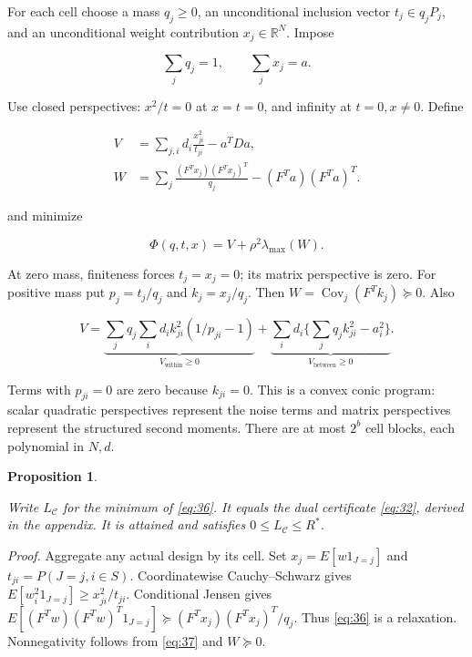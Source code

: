 \documentclass[11pt]{article}
\newtheorem{proposition}[theorem]{Proposition}
\begin{document}
For each cell choose a mass \(q_j\ge0\), an unconditional inclusion
vector \(t_j\in q_jP_j\), and an unconditional weight contribution
\(x_j\in\mathbb R^N\). Impose

\[
\sum_jq_j=1,\qquad \sum_jx_j=a.
\]

Use closed perspectives: \(x^2/t=0\) at \(x=t=0\), and infinity at
\(t=0,x\ne0\). Define

\[
\begin{aligned}
V&=\sum_{j,i}d_i\frac{x_{ji}^2}{t_{ji}}-a^TDa,\\
W&=\sum_j\frac{(F^Tx_j)(F^Tx_j)^T}{q_j}-(F^Ta)(F^Ta)^T.
\end{aligned}
\]

and minimize

\begin{equation}\label{eq:36}
\Phi(q,t,x)=V+\rho^2\lambda_{\max}(W). 
\end{equation}

At zero mass, finiteness forces \(t_j=x_j=0\); its matrix perspective is
zero. For positive mass put \(p_j=t_j/q_j\) and \(k_j=x_j/q_j\). Then
\(W=\operatorname{Cov}_j(F^Tk_j)\succeq0\). Also

\begin{equation}\label{eq:37}
V=\underbrace{\sum_jq_j\sum_i d_i k_{ji}^2(1/p_{ji}-1)}_{V_{\mathrm{within}}\ge0}
+\underbrace{\sum_i d_i\{\sum_jq_jk_{ji}^2-a_i^2\}}_{V_{\mathrm{between}}\ge0}. 
\end{equation}

Terms with \(p_{ji}=0\) are zero because \(k_{ji}=0\). This is a convex
conic program: scalar quadratic perspectives represent the noise terms
and matrix perspectives represent the structured second moments. There
are at most \(2^b\) cell blocks, each polynomial in \(N,d\).

\begin{proposition}\label{th:8}

Write \(L_{\mathcal C}\) for the minimum of \eqref{eq:36}. It equals the
dual certificate \eqref{eq:32}, derived in the appendix. It is attained
and satisfies \(0\le L_{\mathcal C}\le R^*\).

\end{proposition}

\emph{Proof.} Aggregate any actual design by its cell. Set
\(x_j=E[w1_{J=j}]\) and \(t_{ji}=P(J=j,i\in S)\). Coordinatewise
Cauchy--Schwarz gives \(E[w_i^2 1_{J=j}]\ge x_{ji}^2/t_{ji}\).
Conditional Jensen gives
\(E[(F^Tw)(F^Tw)^T1_{J=j}]\succeq (F^Tx_j)(F^Tx_j)^T/q_j\). Thus
\eqref{eq:36} is a relaxation. Nonnegativity follows from \eqref{eq:37}
and \(W\succeq0\).
\end{document}
